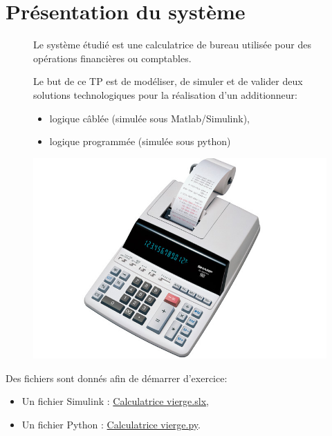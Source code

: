 

\section{Présentation du système}

\begin{figure}[ht!]
 \begin{minipage}{0.55\linewidth}
Le système étudié est une calculatrice de bureau utilisée pour des opérations financières ou comptables.

Le but de ce TP est de modéliser, de simuler et de valider deux solutions technologiques pour la réalisation d'un additionneur:
\begin{itemize}
 \item logique câblée (simulée sous Matlab/Simulink),
 \item logique programmée (simulée sous python)
\end{itemize}
 \end{minipage}
 \hfill
  \begin{minipage}{0.4\linewidth}
   \centering\includegraphics[width=0.7\linewidth]{img/calculatrice.png}
  \end{minipage}
\end{figure}

Des fichiers sont donnés afin de démarrer d'exercice:
\begin{itemize}
 \item Un fichier Simulink : \href{https://github.com/Costadoat/S10/raw/master/TP01\%20Fonctions\%20combinatoires/Code/Calculatrice\_vierge.slx}{Calculatrice vierge.slx},
 \item Un fichier Python : \href{https://github.com/Costadoat/S10/raw/master/TP01\%20Fonctions\%20combinatoires/Code/Calculatrice\_vierge.py}{Calculatrice vierge.py}.
\end{itemize}

